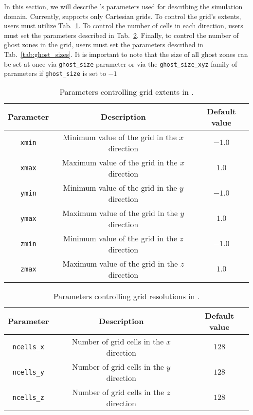 In this section, we will describe \CarpetX's parameters used for describing the simulation domain. Currently, \CarpetX\space supports only Cartesian grids. To control the grid's extents, users must utilize Tab.~\ref{tab:grid_sizes}. To control the number of cells in each direction, users must set the parameters described in Tab.~\ref{tab:num_cells}. Finally, to control the number of ghost zones in the grid, users must set the parameters described in Tab.~\ref{tab:ghost_sizes}. It is important to note that the size of all ghost zones can be set at once via \texttt{ghost\_size} parameter or via the \texttt{ghost\_size\_xyz} family of parameters if \texttt{ghost\_size} is set to $-1$

\begin{table}[ht]
  \centering
  \begin{tabular}{ccc}
  Parameter     & Description                                    & Default value \\\hline\hline
  \texttt{xmin} & Minimum value of the grid in the $x$ direction & $-1.0$        \\
  \texttt{xmax} & Maximum value of the grid in the $x$ direction & $1.0$         \\
  \texttt{ymin} & Minimum value of the grid in the $y$ direction & $-1.0$        \\
  \texttt{ymax} & Maximum value of the grid in the $y$ direction & $1.0$         \\
  \texttt{zmin} & Minimum value of the grid in the $z$ direction & $-1.0$        \\
  \texttt{zmax} & Maximum value of the grid in the $z$ direction & $1.0$         \\\hline\hline
  \end{tabular}
  \caption{Parameters controlling grid extents in \CarpetX.}
  \label{tab:grid_sizes}
\end{table}

\begin{table}[ht]
  \centering
  \begin{tabular}{ccc}
  Parameter          & Description                               & Default value \\\hline\hline
  \texttt{ncells\_x} & Number of grid cells in the $x$ direction & $128$         \\
  \texttt{ncells\_y} & Number of grid cells in the $y$ direction & $128$         \\
  \texttt{ncells\_z} & Number of grid cells in the $z$ direction & $128$         \\\hline\hline
  \end{tabular}
  \caption{Parameters controlling grid resolutions in \CarpetX.}
  \label{tab:num_cells}
\end{table}

